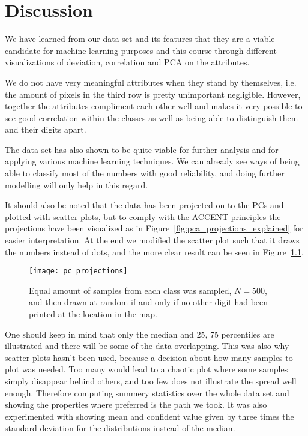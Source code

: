 \chapter{Discussion}
We have learned from our data set and its features that they are a viable candidate for machine learning purposes and this course through different visualizations of deviation, correlation and PCA on the attributes. 

We do not have very meaningful attributes when they stand by themselves, i.e. the amount of pixels in the third row is pretty unimportant negligible. However, together the attributes compliment each other well and makes it very possible to see good correlation within the classes as well as being able to distinguish them and their digits apart.

The data set has also shown to be quite viable for further analysis and for applying various machine learning techniques. We can already see ways of being able to classify most of the numbers with good reliability, and doing further modelling will only help in this regard.

It should also be noted that the data has been projected on to the PCs and plotted with scatter plots, but to comply with the ACCENT principles the projections have been visualized as in Figure~\ref{fig:pca_projections_explained} for easier interpretation. At the end we modified the scatter plot such that it draws the numbers instead of dots, and the more clear result can be seen in Figure~\ref{fig:pc_projections}. 

\begin{figure}[H]
\centering
\texttt{[image: pc\_projections]}
\caption{Equal amount of samples from each class was sampled, $N=500$, and then drawn at random if and only if no other digit had been printed at the location in the map. \label{fig:pc_projections}}
\end{figure}
  
One should keep in mind that only the median and 25, 75 percentiles are illustrated and there will be some of the data overlapping. This was also why scatter plots hasn’t been used, because a decision about how many samples to plot was needed. Too many would lead to a chaotic plot where some samples simply disappear behind others, and too few does not illustrate the spread well enough. Therefore computing summery statistics over the whole data set and showing the properties where preferred is the path we took. It was also experimented with showing mean and confident value given by three times the standard deviation for the distributions instead of the median.

